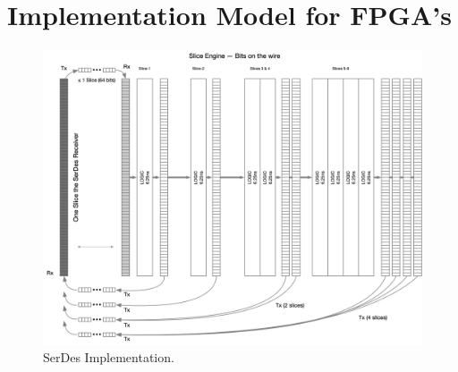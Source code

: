 \documentclass[HFT-main.tex]{subfiles} %
\begin{document}
\section{Implementation Model for FPGA's}

\begin{figure}[h!]
  \centering
  \includegraphics[width=1.5\linewidth]{../figures/Slice-Engine-SACKs.png}
  \caption{SerDes Implementation.}
\end{figure}

\end{document}
